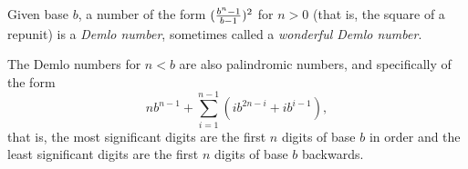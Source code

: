 \documentclass[12pt]{article}
\begin{document}
Given base $b$, a number of the form $({{b^n - 1} \over {b - 1}})^2$ for $n > 0$ (that is, the square of a repunit) is a {\em Demlo number}, sometimes called a {\em wonderful Demlo number}.

The Demlo numbers for $n < b$ are also palindromic numbers, and specifically of the form $$nb^{n - 1} + \sum_{i = 1}^{n - 1} (ib^{2n - i} + ib^{i - 1}),$$ that is, the most significant digits are the first $n$ digits of base $b$ in order and the least significant digits are the first $n$ digits of base $b$ backwards.
\end{document}
